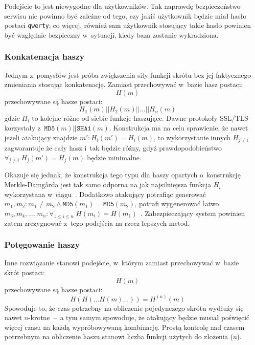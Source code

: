 Podejście to jest niewygodne dla użytkowników. Tak naprawdę bezpieczeństwo
serwisu nie powinno być zależne od tego, czy jakiś użytkownik będzie miał hasło
postaci \texttt{qwerty}; co więcej, również sam użytkownik stosujący takie
hasło powinien być względnie bezpieczny w~sytuacji, kiedy baza zostanie
wykradziona.

\subsubsection{Konkatenacja haszy}

Jednym z~pomysłów jest próba zwiększenia siły funkcji skrótu bez jej
faktycznego zmieniania stosując konkatenację. Zamiast przechowywać w~bazie
hasz postaci:
    $$H(m)$$
przechowywane są hasze postaci:
    $$H_1(m)||H_2(m)||\ldots||H_n(m)$$
gdzie $H_i$ to kolejne różne od siebie funkcje haszujące. Dawne protokoły
SSL/TLS korzystały z~$\mathtt{MD5}(m)||\mathtt{SHA1}(m)$. Konstrukcja ma na
celu sprawienie, że nawet jeżeli atakujący znajdzie $m' : H_i(m') = H_i(m)$, to
wykorzystanie innych $H_{j \neq i}$ zagwarantuje że cały hasz i~tak będzie
różny, gdyż prawdopodobieństwo $\forall_{j \neq i} \; H_j(m') = H_j(m)$ będzie
minimalne.

Okazuje się jednak, że konstrukcja tego typu dla haszy opartych o~konstrukcję
Merkle-Damg\r{a}rda jest tak samo odporna na  jak
najsilniejsza funkcja $H_i$ wykorzystana w~ciągu~\cite{md5_concatenation}.
Dodatkowo atakujący potrafiąc generować $m_1, m_2 : m_1 \neq m_2 \wedge
\mathtt{MD5}(m_1) = \mathtt{MD5}(m_2)$, potrafi wygenerować łatwo $m_3, m_4,
\ldots, m_n : \forall_{1 \leq i \leq n} \; H(m_i) =
H(m_1)$~\cite{md5_multi_collision_attack}. Zabezpieczający system powinien
zatem zrezygnować z~tego podejścia na rzecz lepszych metod.

\subsubsection{Potęgowanie haszy}

Inne rozwiązanie stanowi podejście, w~którym zamiast przechowywać w~bazie skrót
postaci:
    $$H(m)$$
przechowywane są hasze postaci:
    $$H(H(\ldots H(m) \ldots)) = H^{(n)}(m)$$
Spowoduje to, że czas potrzebny na obliczenie pojedynczego skrótu wydłuży się
nawet $n$-krotne~--~a tym samym spowoduje, że atakujący będzie musiał poświęcić
więcej czasu na każdą wypróbowywaną kombinację. Prostą kontrolę nad czasem
potrzebnym na obliczenie haszu stanowi liczba funkcji użytych do złożenia
($n$).


